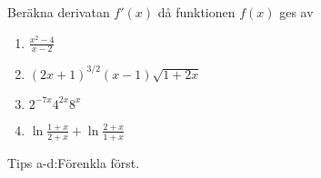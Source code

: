 



Beräkna derivatan $ f'(x) $ då funktionen $ f(x) $ ges av 

\begin{enumerate}
\item $ \frac{x^2-4}{x-2} $
\item $ (2x+1)^{3/2}(x-1)\sqrt{1+2x} $
\item $ 2^{-7x}4^{2x}8^x $
\item $ \ln\frac{1+x}{2+x}+\ln\frac{2+x}{1+x} $
\end{enumerate}
Tips a-d:Förenkla först.